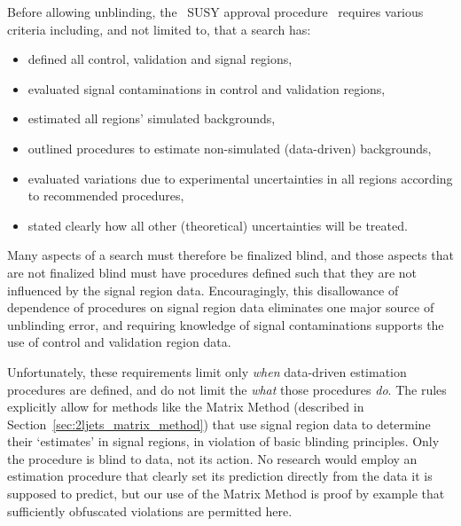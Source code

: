 Before allowing unblinding, the \atlas\ SUSY approval
procedure~\cite{atlas_twiki_susyapprove} requires various criteria including,
and not limited to, that a search has:
\begin{itemize}
\item defined all control, validation and signal regions,
\item evaluated signal contaminations in control and validation regions,
\item estimated all regions' simulated backgrounds,
\item outlined procedures to estimate non-simulated (data-driven) backgrounds,
\item evaluated variations due to experimental uncertainties in all regions
according to recommended procedures,
\item stated clearly how all other (theoretical) uncertainties will be treated.
\end{itemize}
Many aspects of a search must therefore be finalized blind, and those aspects
that are not finalized blind must have procedures defined such that they are
not influenced by the signal region data.
Encouragingly, this disallowance of dependence of procedures on signal region
data eliminates one major source of unblinding error,
and requiring knowledge of signal contaminations supports the use of control
and validation region data.

Unfortunately, these requirements limit only \emph{when} data-driven estimation
procedures are defined, and do not limit the \emph{what} those procedures
\emph{do}.
The rules explicitly allow for methods like the Matrix Method
(described in Section~\ref{sec:2ljets_matrix_method})
that use signal region data to determine their `estimates' in signal
regions, in violation of basic blinding principles.
Only the procedure is blind to data, not its action.
No research would employ an estimation procedure that clearly set its
prediction directly from the data it is supposed to predict, but our use of the
Matrix Method is proof by example that sufficiently obfuscated violations are
permitted here.

